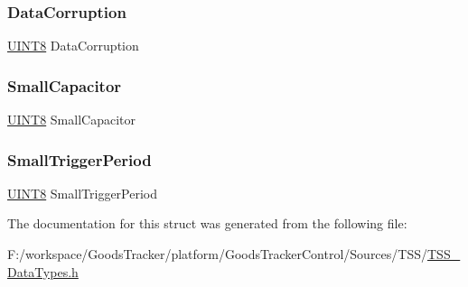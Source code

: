 \subsubsection{\texorpdfstring{Data\+Corruption}{DataCorruption}}
{\footnotesize\ttfamily \hyperlink{_t_s_s___data_types_8h_ab27e9918b538ce9d8ca692479b375b6a}{U\+I\+N\+T8} Data\+Corruption}

\mbox{\label{struct_t_s_s___s_y_s_t_e_m___f_a_u_l_t_s_aa202ca6af617906584b9241593df1926}} 
\subsubsection{\texorpdfstring{Small\+Capacitor}{SmallCapacitor}}
{\footnotesize\ttfamily \hyperlink{_t_s_s___data_types_8h_ab27e9918b538ce9d8ca692479b375b6a}{U\+I\+N\+T8} Small\+Capacitor}

\mbox{\label{struct_t_s_s___s_y_s_t_e_m___f_a_u_l_t_s_a4b21973ca4b25a58eead1e0dbeddca3a}} 
\subsubsection{\texorpdfstring{Small\+Trigger\+Period}{SmallTriggerPeriod}}
{\footnotesize\ttfamily \hyperlink{_t_s_s___data_types_8h_ab27e9918b538ce9d8ca692479b375b6a}{U\+I\+N\+T8} Small\+Trigger\+Period}



The documentation for this struct was generated from the following file\+:\begin{DoxyCompactItemize}
\item 
F\+:/workspace/\+Goods\+Tracker/platform/\+Goods\+Tracker\+Control/\+Sources/\+T\+S\+S/\hyperlink{_t_s_s___data_types_8h}{T\+S\+S\+\_\+\+Data\+Types.\+h}\end{DoxyCompactItemize}
